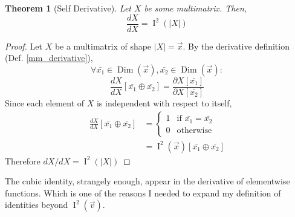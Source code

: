 \documentclass[12pt]{book}
\theoremstyle{plain}
\newtheorem{theorem}{Theorem}[chapter]
\theoremstyle{definition}
\theoremstyle{ppart}
\theoremstyle{case}
\theoremstyle{solution}
\DeclareMathOperator{\Dim}{Dim}
\DeclareMathOperator{\Ident}{I}
\newcommand{\shape}[1]{\left|#1\right|}
\begin{document}
\begin{theorem}[Self Derivative]
\label{self_derivative}
Let $X$ be some multimatrix. Then,
\[ \frac{dX}{dX} = \Ident^2(\shape{X}) \]
\end{theorem}
\begin{proof}
Let $X$ be a multimatrix of shape $\shape{X}=\vec{x}$.
By the derivative definition (Def. \ref{mm_derivative}),
\[
 \forall \bar{x_1} \in \Dim(\vec{x}),
         \bar{x_2} \in \Dim(\vec{x}):
\]
\[
 \frac{dX}{dX}[\bar{x_1} \oplus \bar{x_2}] = 
 \frac{\partial X[\bar{x_1}]}{\partial X[\bar{x_2}]}
\]
Since each element of $X$ is independent with respect to itself,
\begin{align*}
 \frac{dX}{dX}[\bar{x_1} \oplus \bar{x_2}]
 &= \left\{
  \begin{array}{ll}
    1 & \mbox{if } \bar{x_1} = \bar{x_2} \\
    0 & \mbox{otherwise}
  \end{array}
 \right. \\
 &= \Ident^2(\vec{x})[\bar{x_1} \oplus \bar{x_2}]
\end{align*}
Therefore $dX/dX = \Ident^2(\shape{X})$
\end{proof}

The cubic identity, strangely enough, appear in the derivative of elementwise
functions. Which is one of the reasons I needed to expand my definition of
identities beyond $\Ident^2(\vec{v})$.
\end{document}
